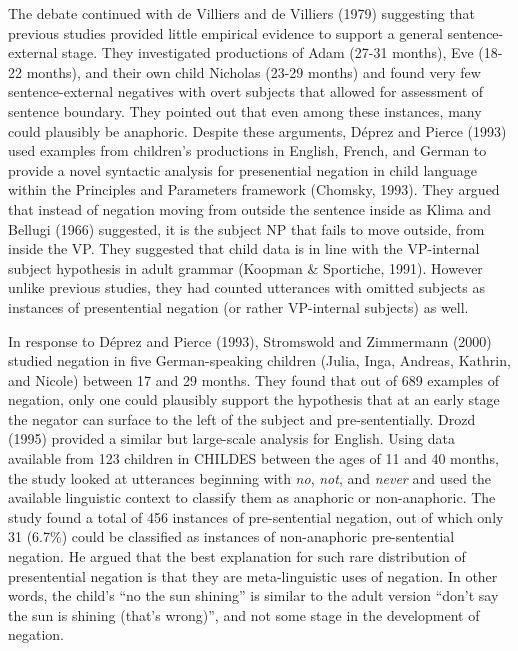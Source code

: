 \documentclass[man,floatsintext,draftall]{apa6}
\begin{document}
The debate continued with de Villiers and de Villiers (1979) suggesting that previous studies provided little empirical evidence to support a general sentence-external stage. They investigated productions of Adam (27-31 months), Eve (18-22 months), and their own child Nicholas (23-29 months) and found very few sentence-external negatives with overt subjects that allowed for assessment of sentence boundary. They pointed out that even among these instances, many could plausibly be anaphoric. Despite these arguments, Déprez and Pierce (1993) used examples from children's productions in English, French, and German to provide a novel syntactic analysis for presenential negation in child language within the Principles and Parameters framework (Chomsky, 1993). They argued that instead of negation moving from outside the sentence inside as Klima and Bellugi (1966) suggested, it is the subject NP that fails to move outside, from inside the VP. They suggested that child data is in line with the VP-internal subject hypothesis in adult grammar (Koopman \& Sportiche, 1991). However unlike previous studies, they had counted utterances with omitted subjects as instances of presentential negation (or rather VP-internal subjects) as well.

In response to Déprez and Pierce (1993), Stromswold and Zimmermann (2000) studied negation in five German-speaking children (Julia, Inga, Andreas, Kathrin, and Nicole) between 17 and 29 months. They found that out of 689 examples of negation, only one could plausibly support the hypothesis that at an early stage the negator can surface to the left of the subject and pre-sententially. Drozd (1995) provided a similar but large-scale analysis for English. Using data available from 123 children in CHILDES between the ages of 11 and 40 months, the study looked at utterances beginning with \emph{no}, \emph{not}, and \emph{never} and used the available linguistic context to classify them as anaphoric or non-anaphoric. The study found a total of 456 instances of pre-sentential negation, out of which only 31 (6.7\%) could be classified as instances of non-anaphoric pre-sentential negation. He argued that the best explanation for such rare distribution of presentential negation is that they are meta-linguistic uses of negation. In other words, the child's \enquote{no the sun shining} is similar to the adult version \enquote{don't say the sun is shining (that's wrong)}, and not some stage in the development of negation.
\end{document}
